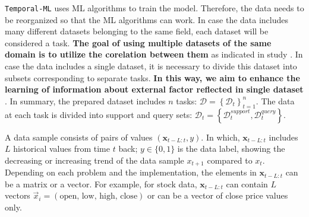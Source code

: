 
\verb|Temporal-ML| uses ML algorithms to train the model. Therefore, the data needs to be reorganized so that the ML algorithms can work. In case the data includes many different datasets belonging to the same field, each dataset will be considered a task. \textbf{The goal of using multiple datasets of the same domain is to utilize the corelation between them} as indicated in study \cite{overreactioncontrarian, mech1993portfolio}. In case the data includes a single dataset, it is necessary to divide this dataset into subsets corresponding to separate tasks. \textbf{In this way, we aim to enhance the learning of information about external factor reflected in single dataset} \cite{fama1970efficient}. In summary, the prepared dataset includes $n$ tasks: $\mathcal{D} = \left\{ \mathcal{D}_t \right\}_{t=1}^{n}$. The data at each task is divided into support and query sets: $\mathcal{D}_t = \left\{ \mathcal{D}_t^{support}, \mathcal{D}_t^{query} \right\}$.


A data sample consists of pairs of values $(\mathbf{x}_{t-L:t}, y)$. In which, $\mathbf{x}_{t-L:t}$ includes $L$ historical values from time $t$ back; $y\in \{0,1\}$ is the data label, showing the decreasing or increasing trend of the data sample $x_{t+1}$ compared to $x_{t}$. Depending on each problem and the implementation, the elements in $\mathbf{x}_{t-L:t}$ can be a matrix or a vector. For example, for stock data, $\mathbf{x}_{t-L:t}$ can contain $L$ vectors $\vec x_i = (\text{open, low, high, close})$ or can be a vector of close price values only.

